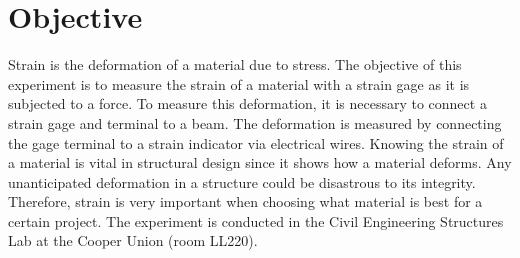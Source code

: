 \documentclass{article}
\begin{document}
    
    \doublespacing
    \tableofcontents
    \newpage
    \listoftables
    \listoffigures
    \newpage
    \section{Objective}
    \indent Strain is the deformation of a material due to stress. The objective of this experiment is to measure the strain of a material with a strain gage as it is subjected to a force. To measure this deformation, it is necessary to connect a strain gage and terminal to a beam. The deformation is measured by connecting the gage terminal to a strain indicator via electrical wires. Knowing the strain of a material is vital in structural design since it shows how a material deforms. Any unanticipated deformation in a structure could be disastrous to its integrity. Therefore, strain is very important when choosing what material is best for a certain project.  The experiment is conducted in the Civil Engineering Structures Lab at the Cooper Union (room LL220). 
    \newpage
\end{document}
